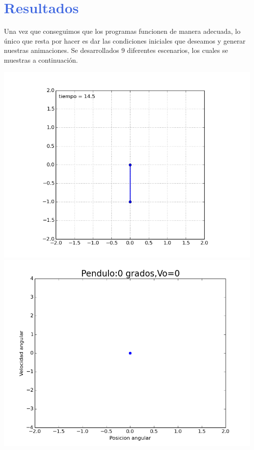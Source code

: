 \documentclass[12pt]{article}
\begin{document}
  







\pagebreak

\section*{\textcolor{RoyalBlue}{Resultados}}
Una vez que conseguimos que los programas funcionen de manera adecuada, lo único que resta por hacer es dar las condiciones iniciales que deseamos y generar nuestras animaciones. Se desarrollados 9 diferentes escenarios, los cuales se muestras a continuación.\\
\begin{center}
\includegraphics[scale=0.5]{0.png}\\
\includegraphics[scale=0.5]{figure_2.png}
\end{center}
\end{document}
